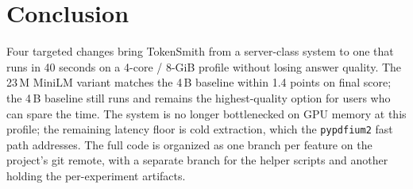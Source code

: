 \documentclass[sigconf]{acmart}
\begin{document}
\section{Conclusion}

Four targeted changes bring TokenSmith from a server-class system to
one that runs in 40 seconds on a 4-core / 8-GiB profile without losing
answer quality. The 23\,M MiniLM variant matches the 4\,B baseline
within 1.4 points on final score; the 4\,B baseline still runs and
remains the highest-quality option for users who can spare the time.
The system is no longer bottlenecked on GPU memory at this profile;
the remaining latency floor is cold extraction, which the
\texttt{pypdfium2} fast path addresses. The full code is organized
as one branch per feature on the project's git remote, with a separate
branch for the helper scripts and another holding the per-experiment
artifacts.
\end{document}
